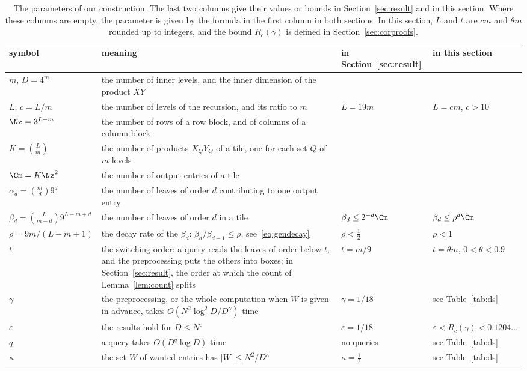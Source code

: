 \begin{table}[!t]
\centering
\small
\renewcommand{\arraystretch}{1.25}
\begin{tabular}{@{}l>{\raggedright\arraybackslash}p{6.3cm}ll@{}}
symbol & meaning & in Section~\ref{sec:result} & in this section\\\hline
$m$, $D=4^m$ & the number of inner levels, and the inner dimension of the product $XY$ & & \\
$L$, $c=L/m$ & the number of levels of the recursion, and its ratio to $m$ & $L=19m$ & $L=cm$, $c>10$\\
$\Nz=3^{L-m}$ & the number of rows of a row block, and of columns of a column block & & \\
$K=\binom Lm$ & the number of products $X_QY_Q$ of a tile, one for each set $Q$ of $m$ levels & & \\
$\Cm=K\Nz^2$ & the number of output entries of a tile & & \\
$\alpha_d=\binom md9^d$ & the number of leaves of order $d$ contributing to one output entry & & \\
$\beta_d=\binom L{m-d}9^{L-m+d}$ & the number of leaves of order $d$ in a tile & $\beta_d\le2^{-d}\Cm$ & $\beta_d\le\rho^d\Cm$\\
$\rho=9m/(L-m+1)$ & the decay rate of the $\beta_d$: $\beta_d/\beta_{d-1}\le\rho$, see~\eqref{eq:gendecay} & $\rho<\frac12$ & $\rho<1$\\
$t$ & the switching order: a query reads the leaves of order below $t$, and the preprocessing puts the others into boxes; in Section~\ref{sec:result}, the order at which the count of Lemma~\ref{lem:count} splits & $t=m/9$ & $t=\theta m$, $0<\theta<0.9$\\
$\gamma$ & the preprocessing, or the whole computation when $W$ is given in advance, takes $O(N^2\log^2\!D/D^{\gamma})$ time & $\gamma=1/18$ & see Table~\ref{tab:ds}\\
$\varepsilon$ & the results hold for $D\le N^{\varepsilon}$ & $\varepsilon=1/18$ & $\varepsilon<R_c(\gamma)<0.1204\ldots$\\
$q$ & a query takes $O(D^{q}\log D)$ time & no queries & see Table~\ref{tab:ds}\\
$\kappa$ & the set $W$ of wanted entries has $|W|\le N^2/D^{\kappa}$ & $\kappa=\frac12$ & see Table~\ref{tab:ds}
\end{tabular}
\caption{The parameters of our construction. The last two columns give their values or bounds in Section~\ref{sec:result} and in this section. Where these columns are empty, the parameter is given by the formula in the first column in both sections. In this section, $L$ and $t$ are $cm$ and $\theta m$ rounded up to integers, and the bound $R_c(\gamma)$ is defined in Section~\ref{sec:corproofs}.}
\label{tab:params}
\end{table}

